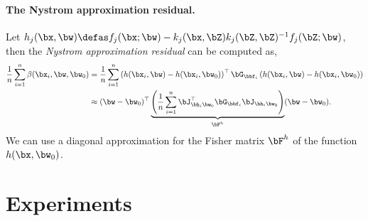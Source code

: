 

\paragraph{The Nystrom approximation residual.}
Let $ h_j(\bx, \bw) \defas f_j(\bx; \bw) - k_j(\bx, \bZ)k_j(\bZ, \bZ)^{-1} f_j(\bZ; \bw)$, then the \emph{Nystrom approximation residual} can be computed as,
\begin{align}
    \frac{1}{n}\sum_{i=1}^n   \beta(\bx_i, \bw, \bw_0) & = 
    \frac{1}{n}\sum_{i=1}^n \left(h(\bx_i, \bw) - h(\bx_i, \bw_0)\right)^{\top} \bG_{\bbf_i}  \left(h(\bx_i, \bw) - h(\bx_i, \bw_0)\right) \notag \\
    & \approx (\bw - \bw_0)^{\top} \underbrace{\left(\frac{1}{n}\sum_{i=1}^n \bJ_{\bh_i \bw_0}^{\top}\bG_{\bbf_i} \bJ_{\bh_i \bw_0}\right)}_{\bF^h} (\bw - \bw_0).
\end{align}
We can use a diagonal approximation for the Fisher matrix $\bF^h$ of the function $h(\bx, \bw_0)$.

\section{Experiments}



